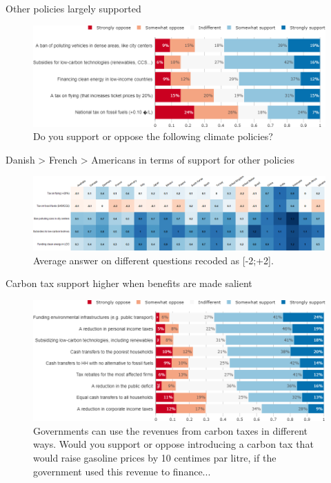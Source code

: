 \begin{framefont}{\small}
\begin{frame}{Other policies largely supported}%
\begin{figure}[h!]
\centering
\caption{Do you support or oppose the following climate policies?}
\vspace{2mm}
\includegraphics[width=.87\paperwidth]{../figures/FR/policy_FR.png}
\end{figure}
\end{frame}

\begin{frame}{Danish > French > Americans in terms of support for other policies}%
\begin{figure}[h!]
\centering
\caption{Average answer on different questions recoded as [-2;+2].}
\vspace{2mm}
\includegraphics[width=\paperwidth]{../figures/country_comparison/policy_mean_countries.png}
\end{figure}
\end{frame}

\begin{frame}{Carbon tax support higher when benefits are made salient}%
\begin{figure}[h!]
\centering
\caption{Governments can use the revenues from carbon taxes in different ways. Would you support or oppose introducing a carbon tax that would raise gasoline prices by 10 centimes par litre, if the government used this revenue to finance...}
\vspace{2mm}
\includegraphics[width=.87\paperwidth]{../figures/FR/tax_FR.png}
\end{figure}
\end{frame}




\end{framefont}
